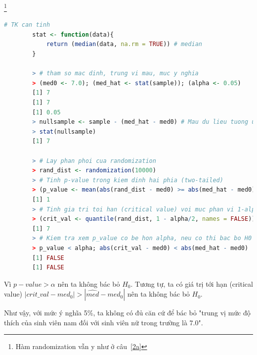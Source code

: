 \documentclass[a4paper,12pt]{article}
\begin{document}
\begin{enumerate}[label = \alph*)]
		\footnote{Hàm randomization vẫn y như ở câu~\ref{2a}}
		\begin{lstlisting}[language=R]
		# TK can tinh
		stat <- function(data){
			return (median(data, na.rm = TRUE)) # median
		}
		
		> # tham so mac dinh, trung vi mau, muc y nghia
		> (med0 <- 7.0); (med_hat <- stat(sample)); (alpha <- 0.05)
		[1] 7
		[1] 7
		[1] 0.05
		> nullsample <- sample - (med_hat - med0) # Mau du lieu tuong ung voi H0
		> stat(nullsample)
		[1] 7
		 
		> # Lay phan phoi cua randomization
		> rand_dist <- randomization(10000)
		> # Tinh p-value trong kiem dinh hai phia (two-tailed)
		> (p_value <- mean(abs(rand_dist - med0) >= abs(med_hat - med0)))
		[1] 1
		> # Tinh gia tri toi han (critical value) voi muc phan vi 1-alpha/2
		> (crit_val <- quantile(rand_dist, 1 - alpha/2, names = FALSE))
		[1] 7
		> # Kiem tra xem p_value co be hon alpha, neu co thi bac bo H0
		> p_value < alpha; abs(crit_val - med0) < abs(med_hat - med0)
		[1] FALSE
		[1] FALSE
		\end{lstlisting}
		
		Vì $p-value > \alpha$ nên ta không bác bỏ $H_0$. Tương tự, ta có giá trị tới hạn (critical value) $|crit\_val - med_0| > |\hat{med} - med_0|$ nên ta không bác bỏ $H_0$. 
		
		Như vậy, với mức ý nghĩa 5\%, ta không có đủ căn cứ để bác bỏ "trung vị mức độ thích của sinh viên nam đối với sinh viên nữ trong trường là $7.0$". 
	\end{enumerate}
	
\end{document}
